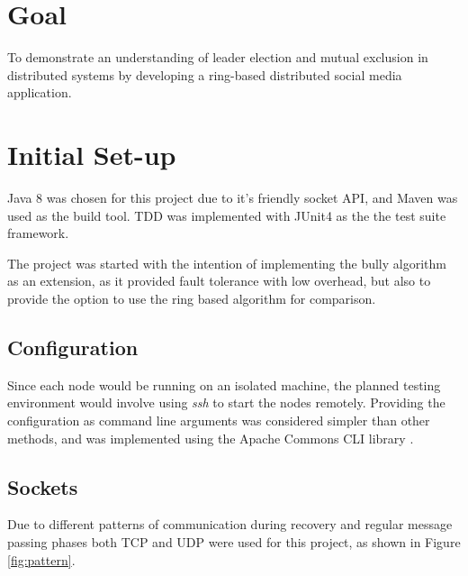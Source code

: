 \documentclass[12pt]{article}
\begin{document}
\begin{titlepage}

\vfill %

\end{titlepage}

\section*{Goal}

To demonstrate an understanding of leader election and mutual exclusion in distributed systems by developing a ring-based distributed social media application.

\tableofcontents
\newpage

\setcounter{page}{1} 

\section{Initial Set-up}

Java 8 was chosen for this project due to it's friendly socket API, and Maven \cite{maven} was used as the build tool. TDD was implemented with JUnit4 as the the test suite framework.

The project was started with the intention of implementing the bully algorithm as an extension, as it provided fault tolerance with low overhead, but also to provide the option to use the ring based algorithm for comparison.

\subsection{Configuration}

Since each node would be running on an isolated machine, the planned testing environment would involve using \emph{ssh} to start the nodes remotely. Providing the configuration as command line arguments was considered simpler than other methods, and was implemented using the Apache Commons CLI library \cite{apachecli}.

\subsection{Sockets}

Due to different patterns of communication during recovery and regular message passing phases both TCP and UDP were used for this project, as shown in Figure \ref{fig:pattern}.
\end{document}
